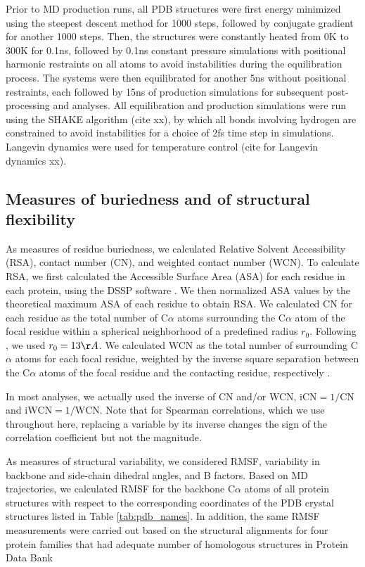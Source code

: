 \documentclass[12pt]{article}
\begin{document}
Prior to MD production runs, all PDB structures were first energy minimized using the steepest descent method for 1000 steps, followed by conjugate gradient for another 1000 steps. Then, the structures were constantly heated from 0K to 300K for 0.1ns, followed by 0.1ns constant pressure simulations with positional harmonic restraints on all atoms to avoid instabilities during the equilibration process. The systems were then equilibrated for another 5ns without positional restraints, each followed by 15ns of production simulations for subsequent post-processing and analyses. All equilibration and production simulations were run using the SHAKE algorithm (cite xx), {\color{blue}by which all bonds involving hydrogen are constrained to avoid instabilities for a choice of 2fs time step in simulations.} Langevin dynamics were used for temperature control (cite for Langevin dynamics xx).

\subsection*{Measures of buriedness and of structural flexibility}

As measures of residue buriedness, we calculated Relative Solvent Accessibility (RSA), contact number (CN), and weighted contact number (WCN). To calculate RSA, we first calculated the Accessible Surface Area (ASA) for each residue in each protein, using the DSSP software \citep{KabschSander1983}. We then normalized ASA values by the theoretical maximum ASA of each residue \citep{Tienetal2013} to obtain RSA. We calculated CN for each residue as the total number of C$\alpha$ atoms surrounding the  C$\alpha$ atom of the focal residue within a spherical neighborhood of a predefined radius $r_0$. Following \citet{Yehetal2014}, we used $r_0=13\AA$. We calculated WCN as the total number of surrounding C$\alpha$ atoms for each focal residue, weighted by the inverse square separation between the C$\alpha$ atoms of the focal residue and the contacting residue, respectively \citep{Shihetal2012}.

In most analyses, we actually used the inverse of CN and/or WCN, $\text{iCN}=1/\text{CN}$ and $\text{iWCN}=1/\text{WCN}$. Note that for Spearman correlations, which we use throughout here, replacing a variable by its inverse changes the sign of the correlation coefficient but not the magnitude.

As measures of structural variability, we considered RMSF, variability in backbone and side-chain dihedral angles, and B factors. {\color{blue}Based on MD trajectories, we calculated RMSF for the backbone C$\alpha$ atoms of all protein structures with respect to the corresponding coordinates of the PDB crystal structures listed in Table \ref{tab:pdb_names}. In addition, the same RMSF measurements were carried out based on the structural alignments for four protein families that had adequate number of homologous structures in Protein Data Bank}
\end{document}
